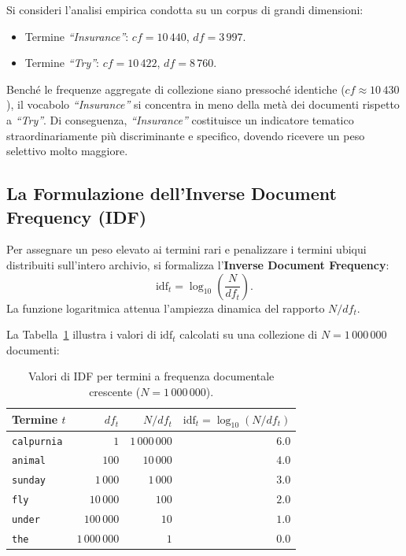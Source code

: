 \begin{example}
Si consideri l'analisi empirica condotta su un corpus di grandi dimensioni:
\begin{itemize}
    \item Termine \textit{``Insurance''}: $cf = 10\,440$, \quad $df = 3\,997$.
    \item Termine \textit{``Try''}: $cf = 10\,422$, \quad $df = 8\,760$.
\end{itemize}
Benché le frequenze aggregate di collezione siano pressoch\'e identiche ($cf \approx 10\,430$), il vocabolo \textit{``Insurance''} si concentra in meno della met\`a dei documenti rispetto a \textit{``Try''}. Di conseguenza, \textit{``Insurance''} costituisce un indicatore tematico straordinariamente pi\`u discriminante e specifico, dovendo ricevere un peso selettivo molto maggiore.
\end{example}

\subsection{La Formulazione dell'Inverse Document Frequency (IDF)}

Per assegnare un peso elevato ai termini rari e penalizzare i termini ubiqui distribuiti sull'intero archivio, si formalizza l'\textbf{Inverse Document Frequency}:
\begin{equation}
\text{idf}_t = \log_{10}\left(\frac{N}{df_t}\right).
\label{eq:idf-formula}
\end{equation}
La funzione logaritmica attenua l'ampiezza dinamica del rapporto $N / df_t$. 

La Tabella~\ref{tab:idf-values} illustra i valori di $\text{idf}_t$ calcolati su una collezione di $N = 1\,000\,000$ documenti:
\begin{table}[H]
\centering
\small
\begin{tabular}{l r r r}
\toprule
\textbf{Termine } $t$ & $df_t$ & $N / df_t$ & $\text{idf}_t = \log_{10}(N / df_t)$ \\
\midrule
\texttt{calpurnia} & $1$ & $1\,000\,000$ & $6.0$ \\
\texttt{animal} & $100$ & $10\,000$ & $4.0$ \\
\texttt{sunday} & $1\,000$ & $1\,000$ & $3.0$ \\
\texttt{fly} & $10\,000$ & $100$ & $2.0$ \\
\texttt{under} & $100\,000$ & $10$ & $1.0$ \\
\texttt{the} & $1\,000\,000$ & $1$ & $0.0$ \\
\bottomrule
\end{tabular}
\caption{Valori di IDF per termini a frequenza documentale crescente ($N = 1\,000\,000$).}
\label{tab:idf-values}
\end{table}

